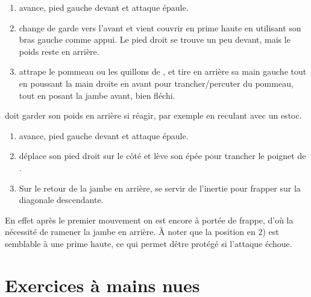 \begin{technique}
	\label{att:tech:changement-garde-2-temps-prime-haute}

	\begin{enumerate}
		\item \D avance, pied gauche devant et \A attaque épaule.
		
		\item \D change de garde vers l'avant et vient couvrir en prime haute en utilisant son bras gauche comme appui.
		Le pied droit se trouve un peu devant, mais le poids reste en arrière.
		
		\item \D attrape le pommeau ou les quillons de \A, et tire en arrière sa main gauche tout en poussant la main droite en avant pour trancher/percuter du pommeau, tout en posant la jambe avant, bien fléchi.
	\end{enumerate}

	\D doit garder son poids en arrière si \A réagir, par exemple en reculant avec un estoc.

\end{technique}


\begin{technique}
	\label{att:tech:changement-garde-2-temps-latéral-prime}

	\begin{enumerate}
		\item \D avance, pied gauche devant et \A attaque épaule.
		
		\item \D déplace son pied droit sur le côté et lève son épée pour trancher le poignet de \A.
		
		\item Sur le retour de la jambe en arrière, se servir de l'inertie pour frapper sur la diagonale descendante.
	\end{enumerate}

	En effet après le premier mouvement on est encore à portée de frappe, d'où la nécessité de ramener la jambe en arrière.
	À noter que la position en 2) est semblable à une prime haute, ce qui permet dêtre protégé si l'attaque échoue.
\end{technique}


\section{Exercices à mains nues}


